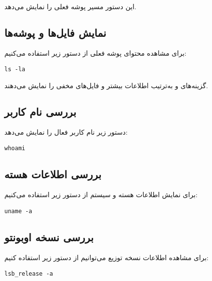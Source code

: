 \documentclass[12pt,a4paper]{article}
\begin{document}
این دستور مسیر پوشه فعلی را نمایش می‌دهد.

\subsection{نمایش فایل‌ها و پوشه‌ها}

برای مشاهده محتوای پوشه فعلی از دستور زیر
استفاده می‌کنیم:

\begin{latin}
\begin{lstlisting}
ls -la
\end{lstlisting}
\end{latin}

گزینه‌های  و  به‌ترتیب اطلاعات
بیشتر و فایل‌های مخفی را نمایش می‌دهند.

\subsection{بررسی نام کاربر}

دستور زیر نام کاربر فعال را نمایش می‌دهد:

\begin{latin}
\begin{lstlisting}
whoami
\end{lstlisting}
\end{latin}

\subsection{بررسی اطلاعات هسته}

برای نمایش اطلاعات هسته و سیستم از دستور زیر
استفاده می‌کنیم:

\begin{latin}
\begin{lstlisting}
uname -a
\end{lstlisting}
\end{latin}

\subsection{بررسی نسخه اوبونتو}

برای مشاهده اطلاعات نسخه توزیع می‌توانیم
از دستور زیر استفاده کنیم:

\begin{latin}
\begin{lstlisting}
lsb_release -a
\end{lstlisting}
\end{latin}
\end{document}
